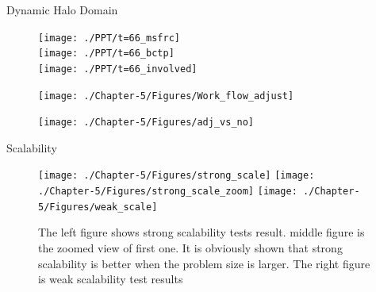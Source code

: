 \documentclass{beamer}
\begin{document}
\begin{frame}{Dynamic Halo Domain}
\begin{minipage}{0.285 \textwidth}
\begin{figure}
\flushleft
\texttt{[image: ./PPT/t=66\_msfrc]}
\\
\flushleft
\texttt{[image: ./PPT/t=66\_bctp]}
\\
\flushleft
\texttt{[image: ./PPT/t=66\_involved]}
\end{figure}
\end{minipage}
\hfill
\begin{minipage}{0.34\textwidth}
\begin{figure}
\texttt{[image: ./Chapter-5/Figures/Work\_flow\_adjust]}
\end{figure}
\end{minipage}
\hfill
\begin{minipage}{0.355 \textwidth}
\begin{scriptsize}
\linespread{1.0}{
SWCH: switch pressure ghost particles to real. ADPP: add new pressure ghost particles. ADWP: add wall ghost particles. SCN: scann the outmost layer of the domain}
\end{scriptsize}
\center
{}
\begin{figure}
\texttt{[image: ./Chapter-5/Figures/adj\_vs\_no]}
\end{figure}
\end{minipage}
\end{frame}

\begin{frame}{Scalability}
\begin{figure}
\flushleft
\texttt{[image: ./Chapter-5/Figures/strong\_scale]}
\hfill
\texttt{[image: ./Chapter-5/Figures/strong\_scale\_zoom]}
\hfill
\texttt{[image: ./Chapter-5/Figures/weak\_scale]}
\caption{The left figure shows strong scalability tests result. middle figure is the zoomed view of first one. It is obviously shown that strong scalability is better when the problem size is larger. The right figure is weak scalability test results}
\label{fig:2cases_efficiency}
\end{figure}
%
\end{frame}
\end{document}
